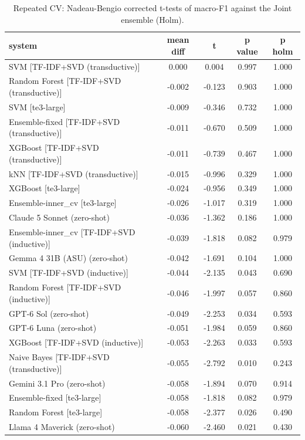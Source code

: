 \begin{table}[htbp]
\centering
\caption{Repeated CV: Nadeau-Bengio corrected t-tests of macro-F1 against the Joint ensemble (Holm).}
\label{tab:table7_cv_tests_vs_joint}
\small
\begin{tabular}{lcccc}
\toprule
\textbf{system} & \textbf{mean diff} & \textbf{t} & \textbf{p value} & \textbf{p holm} \\
\midrule
SVM [TF-IDF+SVD (transductive)] & 0.000 & 0.004 & 0.997 & 1.000 \\
Random Forest [TF-IDF+SVD (transductive)] & -0.002 & -0.123 & 0.903 & 1.000 \\
SVM [te3-large] & -0.009 & -0.346 & 0.732 & 1.000 \\
Ensemble-fixed [TF-IDF+SVD (transductive)] & -0.011 & -0.670 & 0.509 & 1.000 \\
XGBoost [TF-IDF+SVD (transductive)] & -0.011 & -0.739 & 0.467 & 1.000 \\
kNN [TF-IDF+SVD (transductive)] & -0.015 & -0.996 & 0.329 & 1.000 \\
XGBoost [te3-large] & -0.024 & -0.956 & 0.349 & 1.000 \\
Ensemble-inner\_cv [te3-large] & -0.026 & -1.017 & 0.319 & 1.000 \\
Claude 5 Sonnet (zero-shot) & -0.036 & -1.362 & 0.186 & 1.000 \\
Ensemble-inner\_cv [TF-IDF+SVD (inductive)] & -0.039 & -1.818 & 0.082 & 0.979 \\
Gemma 4 31B (ASU) (zero-shot) & -0.042 & -1.691 & 0.104 & 1.000 \\
SVM [TF-IDF+SVD (inductive)] & -0.044 & -2.135 & 0.043 & 0.690 \\
Random Forest [TF-IDF+SVD (inductive)] & -0.046 & -1.997 & 0.057 & 0.860 \\
GPT-6 Sol (zero-shot) & -0.049 & -2.253 & 0.034 & 0.593 \\
GPT-6 Luna (zero-shot) & -0.051 & -1.984 & 0.059 & 0.860 \\
XGBoost [TF-IDF+SVD (inductive)] & -0.053 & -2.263 & 0.033 & 0.593 \\
Naive Bayes [TF-IDF+SVD (transductive)] & -0.055 & -2.792 & 0.010 & 0.243 \\
Gemini 3.1 Pro (zero-shot) & -0.058 & -1.894 & 0.070 & 0.914 \\
Ensemble-fixed [te3-large] & -0.058 & -1.818 & 0.082 & 0.979 \\
Random Forest [te3-large] & -0.058 & -2.377 & 0.026 & 0.490 \\
Llama 4 Maverick (zero-shot) & -0.060 & -2.460 & 0.021 & 0.430 \\

\end{tabular}
\end{table}
